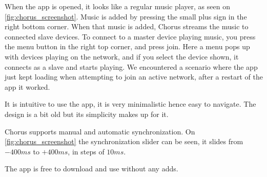 When the app is opened, it looks like a regular music player, as seen on \cref{fig:chorus_screenshot}.
Music is added by pressing the small plus sign in the right bottom corner. 
When that music is added, Chorus streams the music to connected slave devices.
To connect to a master device playing music, you press the menu button in the right top corner, and press join.
Here a menu pops up with devices playing on the network, and if you select the device shown, it connects as a slave and starts playing.
We encountered a scenario where the app just kept loading when attempting to join an active network, after a restart of the app it worked.

It is intuitive to use the app, it is very minimalistic hence easy to navigate.
The design is a bit old but its simplicity makes up for it.

Chorus supports manual and automatic synchronization.
On \cref{fig:chorus_screenshot} the synchronization slider can be seen,
it slides from $-400ms$ to $+400ms$, in steps of $10 ms$.

The app is free to download and use without any adds.\cite{chrous_play} 

